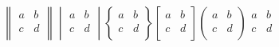 \documentclass{amsart}
\numberwithin{equation}{section}
\begin{document}
\begin{equation}
  \begin{Vmatrix}
    a & b \\
    c & d \\
  \end{Vmatrix}
  \begin{vmatrix}
    a & b \\
    c & d \\
  \end{vmatrix}
  \begin{Bmatrix}
    a & b \\
    c & d \\
  \end{Bmatrix}
  \begin{bmatrix}
    a & b \\
    c & d \\
  \end{bmatrix}
  \begin{pmatrix}
    a & b \\
    c & d \\
  \end{pmatrix}
  \begin{smallmatrix}
    a & b \\
    c & d \\
  \end{smallmatrix}
\end{equation}
\end{document}
